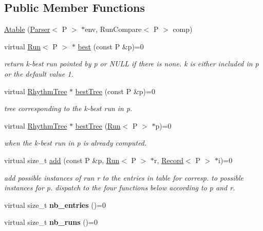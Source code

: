 \subsection*{Public Member Functions}
\begin{DoxyCompactItemize}
\item 
\mbox{\hyperlink{classAtable_ad519343a13265a31ba1d0951be0e3185}{Atable}} (\mbox{\hyperlink{classParser}{Parser}}$<$ P $>$ $\ast$env, Run\+Compare$<$ P $>$ comp)
\item 
virtual \mbox{\hyperlink{classRun}{Run}}$<$ P $>$ $\ast$ \mbox{\hyperlink{classAtable_a60515b93afede66f01a0e89edb563800}{best}} (const P \&p)=0
\begin{DoxyCompactList}\small\item\em return k-\/best run pointed by p or N\+U\+LL if there is none. k is either included in p or the default value 1. \end{DoxyCompactList}\item 
\mbox{\label{classAtable_af3a86206727f9d28cd3e962f709b9bc2}} 
virtual \mbox{\hyperlink{classRhythmTree}{Rhythm\+Tree}} $\ast$ \mbox{\hyperlink{classAtable_af3a86206727f9d28cd3e962f709b9bc2}{best\+Tree}} (const P \&p)=0
\begin{DoxyCompactList}\small\item\em tree corresponding to the k-\/best run in p. \end{DoxyCompactList}\item 
virtual \mbox{\hyperlink{classRhythmTree}{Rhythm\+Tree}} $\ast$ \mbox{\hyperlink{classAtable_a48dfc1adb76a6d50824f28df2f8cd692}{best\+Tree}} (\mbox{\hyperlink{classRun}{Run}}$<$ P $>$ $\ast$p)=0
\begin{DoxyCompactList}\small\item\em when the k-\/best run in p is already computed. \end{DoxyCompactList}\item 
virtual size\+\_\+t \mbox{\hyperlink{classAtable_ab644eecedb520d67da426f9170a6213b}{add}} (const P \&p, \mbox{\hyperlink{classRun}{Run}}$<$ P $>$ $\ast$r, \mbox{\hyperlink{classRecord}{Record}}$<$ P $>$ $\ast$i)=0
\begin{DoxyCompactList}\small\item\em add possible instances of run r to the entries in table for corresp. to possible instances for p. dispatch to the four functions below according to p and r. \end{DoxyCompactList}\item 
\mbox{\label{classAtable_a90e01b017faeec6869df32bd50ce5b35}} 
virtual size\+\_\+t {\bfseries nb\+\_\+entries} ()=0
\item 
\mbox{\label{classAtable_a66029b49ab5cece68c4a0635a821b877}} 
virtual size\+\_\+t {\bfseries nb\+\_\+runs} ()=0
\end{DoxyCompactItemize}
